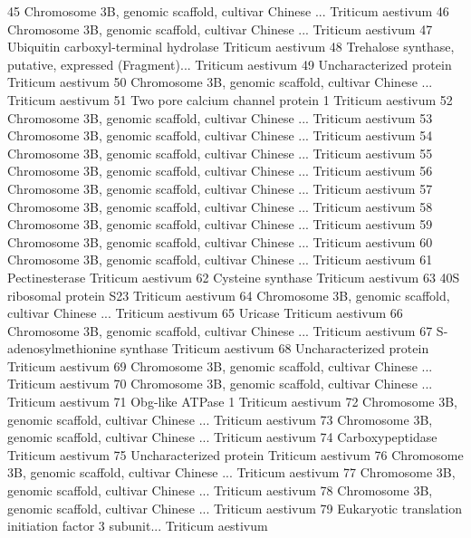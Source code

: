 \documentclass{beamer}
\begin{document}
\begin{frame}[fragile]
\begin{itemize}
\begin{Schunk}
\begin{Soutput}
45 Chromosome 3B, genomic scaffold, cultivar Chinese ... Triticum aestivum
46 Chromosome 3B, genomic scaffold, cultivar Chinese ... Triticum aestivum
47                 Ubiquitin carboxyl-terminal hydrolase Triticum aestivum
48 Trehalose synthase, putative, expressed (Fragment)... Triticum aestivum
49                               Uncharacterized protein Triticum aestivum
50 Chromosome 3B, genomic scaffold, cultivar Chinese ... Triticum aestivum
51                    Two pore calcium channel protein 1 Triticum aestivum
52 Chromosome 3B, genomic scaffold, cultivar Chinese ... Triticum aestivum
53 Chromosome 3B, genomic scaffold, cultivar Chinese ... Triticum aestivum
54 Chromosome 3B, genomic scaffold, cultivar Chinese ... Triticum aestivum
55 Chromosome 3B, genomic scaffold, cultivar Chinese ... Triticum aestivum
56 Chromosome 3B, genomic scaffold, cultivar Chinese ... Triticum aestivum
57 Chromosome 3B, genomic scaffold, cultivar Chinese ... Triticum aestivum
58 Chromosome 3B, genomic scaffold, cultivar Chinese ... Triticum aestivum
59 Chromosome 3B, genomic scaffold, cultivar Chinese ... Triticum aestivum
60 Chromosome 3B, genomic scaffold, cultivar Chinese ... Triticum aestivum
61                                        Pectinesterase Triticum aestivum
62                                     Cysteine synthase Triticum aestivum
63                             40S ribosomal protein S23 Triticum aestivum
64 Chromosome 3B, genomic scaffold, cultivar Chinese ... Triticum aestivum
65                                               Uricase Triticum aestivum
66 Chromosome 3B, genomic scaffold, cultivar Chinese ... Triticum aestivum
67                         S-adenosylmethionine synthase Triticum aestivum
68                               Uncharacterized protein Triticum aestivum
69 Chromosome 3B, genomic scaffold, cultivar Chinese ... Triticum aestivum
70 Chromosome 3B, genomic scaffold, cultivar Chinese ... Triticum aestivum
71                                     Obg-like ATPase 1 Triticum aestivum
72 Chromosome 3B, genomic scaffold, cultivar Chinese ... Triticum aestivum
73 Chromosome 3B, genomic scaffold, cultivar Chinese ... Triticum aestivum
74                                      Carboxypeptidase Triticum aestivum
75                               Uncharacterized protein Triticum aestivum
76 Chromosome 3B, genomic scaffold, cultivar Chinese ... Triticum aestivum
77 Chromosome 3B, genomic scaffold, cultivar Chinese ... Triticum aestivum
78 Chromosome 3B, genomic scaffold, cultivar Chinese ... Triticum aestivum
79 Eukaryotic translation initiation factor 3 subunit... Triticum aestivum

\end{Soutput}
\end{Schunk}
\end{itemize}
\end{frame}
\end{document}
